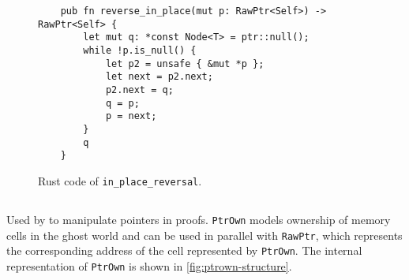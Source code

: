 \documentclass[11pt,a4paper]{article}
\begin{document}
\begin{figure}[tp]
    \begin{verbatim}
    pub fn reverse_in_place(mut p: RawPtr<Self>) -> RawPtr<Self> {
        let mut q: *const Node<T> = ptr::null();
        while !p.is_null() {
            let p2 = unsafe { &mut *p };
            let next = p2.next;
            p2.next = q;
            q = p;
            p = next;
        }
        q
    }
    \end{verbatim}
\caption{Rust code of \texttt{in\_place\_reversal}.}
\label{fig:reversalinp}
\end{figure}


\subsection{}
\subsubsection{} Used by \creusot{} to manipulate pointers in proofs. \texttt{PtrOwn} models ownership of memory cells in the ghost world and can be used in parallel with \texttt{RawPtr}, which represents the corresponding address of the cell represented by \texttt{PtrOwn}. The internal representation of \texttt{PtrOwn} is shown in \autoref{fig:ptrown-structure}.
\end{document}
